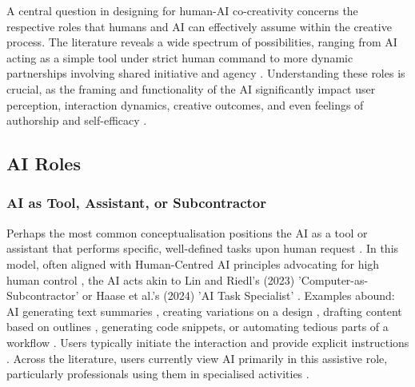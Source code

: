 A central question in designing for human-AI co-creativity concerns the respective roles that humans and AI can effectively assume within the creative process. The literature reveals a wide spectrum of possibilities, ranging from AI acting as a simple tool under strict human command to more dynamic partnerships involving shared initiative and agency \citep{Moruzzi2022-tx, Haase2024-yp, Guzdial2019-gr, Lin2023-jd}. Understanding these roles is crucial, as the framing and functionality of the AI significantly impact user perception, interaction dynamics, creative outcomes, and even feelings of authorship and self-efficacy \citep{Guzdial2019-gr, Lawton2023-tb, McGuire2024-im, Lehmann2022-kr}.

\subsection{AI Roles}

\subsubsection{AI as Tool, Assistant, or Subcontractor}

Perhaps the most common conceptualisation positions the AI as a tool or assistant that performs specific, well-defined tasks upon human request \citep{Lubart2005-zi, Norman1994-kz}. In this model, often aligned with Human-Centred AI principles advocating for high human control \citep{Shneiderman2020-je}, the AI acts akin to Lin and Riedl's (2023) 'Computer-as-Subcontractor' \citep{Lin2023-jd} or Haase et al.'s (2024) 'AI Task Specialist' \citep{Haase2024-yp}. Examples abound: AI generating text summaries \citep{Tholander2023-rv}, creating variations on a design \citep{Kim2021-fh}, drafting content based on outlines \citep{Mirowski2023-oz, Lee2024-vz}, generating code snippets, or automating tedious parts of a workflow \citep{Li2024-yh}. Users typically initiate the interaction and provide explicit instructions \citep{Oh2018-mu}. Across the literature, users currently view AI primarily in this assistive role, particularly professionals using them in specialised activities \citep{Li2024-yh, Yuan2022-kb}. 

